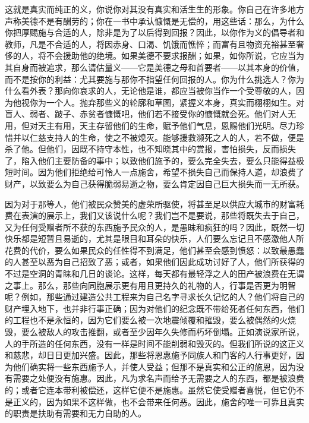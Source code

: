 这就是真实而纯正的义，你说你对其没有真实和活生生的形象。你自己在许多地方声称美德不是有酬劳的；你在一书中承认慷慨是无偿的，用这些话：那么，为什么你把厚赐施与合适的人，除非是为了以后得到回报？因此，以你作为义的倡导者和教师，凡是不合适的人，将因赤身、口渴、饥饿而憔悴；而富有且物资充裕甚至奢侈的人，将不会援助他的绝境。如果美德不要求报酬；如果，如你所说，它应当为其自身而被追求，那么请估量义——它是美德之母和首要者——以其本身的价值，而不是按你的利益：尤其要施与那你不指望任何回报的人。你为什么挑选人？你为什么看外表？那向你哀求的人，无论他是谁，都应当被你当作一个受尊敬的人，因为他视你为一个人。抛弃那些义的轮廓和草图，紧握义本身，真实而栩栩如生。对盲人、弱者、跛子、赤贫者慷慨吧，他们若不接受你的慷慨就会死。他们对人无用，但对天主有用，天主存留他们的生命，赋予他们气息，恩赐他们光明。尽力珍惜并以仁慈支持人的生命，使之不被熄灭。能够援救濒死之人的人，若不做，便是杀了他。但他们，因既不持守本性，也不知晓其中的赏报，害怕损失，反而损失了，陷入他们主要防备的事中；以致他们施予的，要么完全失去，要么只能得益极短时间。因为他们拒绝给可怜人一点施舍，希望不损失自己而保持人道，却浪费了财产，以致要么为自己获得脆弱易逝之物，要么肯定因自己巨大损失而一无所获。\par

因为对于那等人，他们被民众赞美的虚荣所驱使，将甚至足以供应大城市的财富耗费在表演的展示上，我们又该说什么呢？我们岂不是要说，那些将既失去于自己，又为任何受赠者所不获的东西施予民众的人，是愚昧和疯狂的吗？因此，既然一切快乐都是短暂且易逝的，尤其是眼目和耳朵的快乐，人们要么忘记且不感激他人所花费的代价，要么如果民众的任性得不到满足，他们甚至会感到愤怒：以致最愚蠢的人甚至以恶为自己招致了恶；或者，如果他们因此成功讨好了人，他们所获得的不过是空洞的青睐和几日的谈论。这样，每天都有最轻浮之人的田产被浪费在无谓之事上。那么，那些向同胞展示更有用且更持久的礼物的人，行事是否更为明智呢？例如，那些通过建造公共工程来为自己名字寻求长久记忆的人？他们将自己的财产埋入地下，也并非行事正确；因为对他们的纪念既不带给死者任何东西，他们的工程也不是永恒的，因为它们要么被一次地震倾覆和摧毁，要么被偶然的火烧毁，要么被敌人的攻击推翻，或者至少因年久失修而朽坏倒塌。正如演说家所说，人的手所造的任何东西，没有一样是时间不能削弱和毁灭的。但我们所说的这正义和慈悲，却日日更加兴盛。因此，那些将恩惠施予同族人和门客的人行事更好，因为他们确实将一些东西施予人，并使人受益；但那不是真实和公正的施恩，因为没有需要之处便没有施惠。因此，凡为求名声而给予无需要之人的东西，都是被浪费的；或者它连本带利被偿还，这样它便不是施惠。虽然它使受赠者喜悦，但它仍不是正义的，因为如果不这样做，也不会带来任何恶。因此，施舍的唯一可靠且真实的职责是扶助有需要和无力自助的人。\par

